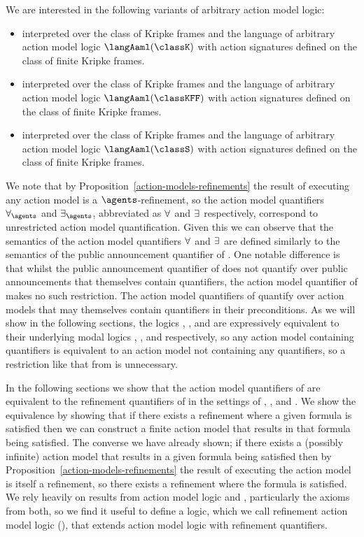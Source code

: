 We are interested in the following variants of arbitrary action model logic:
\begin{itemize}
    \item \logicAamlK{} interpreted over the class of \classK{} Kripke frames and the language of arbitrary action model logic $\langAaml(\classK)$ with action signatures defined on the class of finite \classK{} Kripke frames.
    \item \logicAamlKFF{} interpreted over the class of \classKFF{} Kripke frames and the language of arbitrary action model logic $\langAaml(\classKFF)$ with action signatures defined on the class of finite \classKFF{} Kripke frames.
    \item \logicAamlS{} interpreted over the class of \classS{} Kripke frames and the language of arbitrary action model logic $\langAaml(\classS)$ with action signatures defined on the class of finite \classS{} Kripke frames.
\end{itemize}

We note that by Proposition~\ref{action-models-refinements} the result of executing any action model is a $\agents$-refinement, so the action model quantifiers $\allactsAs$ and $\someactsAs$, abbreviated as $\allacts$ and $\someacts$ respectively, correspond to unrestricted action model quantification.
Given this we can observe that the semantics of the action model quantifiers $\allacts$ and $\someacts$ are defined similarly to the semantics of the public announcement quantifier of \logicApal{}.
One notable difference is that whilst the public announcement quantifier of \logicApal{} does not quantify over public announcements that themselves contain quantifiers, the action model quantifier of \logicAaml{} makes no such restriction.
The action model quantifiers of \logicAaml{} quantify over action models that may themselves contain quantifiers in their preconditions.
As we will show in the following sections, the logics \logicAamlK{}, \logicAamlKFF{}, and \logicAamlS{} are expressively equivalent to their underlying modal logics \logicK{}, \logicKFF{}, and \logicS{} respectively, so any action model containing quantifiers is equivalent to an action model not containing any quantifiers, so a restriction like that from \logicApal{} is unnecessary.

In the following sections we show that the action model quantifiers of \logicAaml{} are equivalent to the refinement quantifiers of \logicRml{} in the settings of \classK{}, \classKFF{}, and \classS{}.
We show the equivalence by showing that if there exists a refinement where a given formula is satisfied then we can construct a finite action model that results in that formula being satisfied.
The converse we have already shown; if there exists a (possibly infinite) action model that results in a given formula being satisfied then by Proposition~\ref{action-models-refinements} the result of executing the action model is itself a refinement, so there exists a refinement where the formula is satisfied.
We rely heavily on results from action model logic and \logicRml{}, particularly the axioms from both, so we find it useful to define a logic, which we call refinement action model logic (\logicRaml{}), that extends action model logic with refinement quantifiers.


